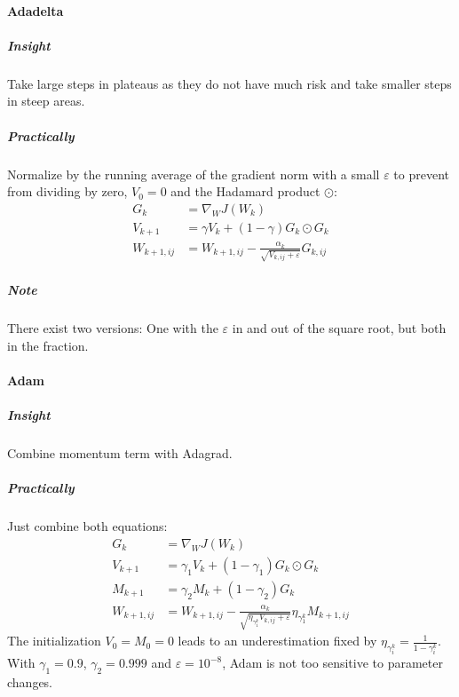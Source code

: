 			\paragraph{Adadelta}
				\subparagraph{Insight}
					Take large steps in plateaus as they do not have much risk and take smaller steps in steep areas.

				\subparagraph{Practically}
					Normalize by the running average of the gradient norm with a small \(\varepsilon\) to prevent from dividing by zero, \( V_0 = 0 \) and the Hadamard product \( \odot \):
					\begin{align}
						G_k           & = \nabla_W J(W_k)                                                           \\
						V_{k + 1}     & = \gamma V_k + (1 - \gamma) G_k \odot G_k                                   \\
						W_{k + 1, ij} & = W_{k + 1, ij} - \frac{\alpha_k}{\sqrt{V_{k, ij} + \varepsilon}} G_{k, ij}
					\end{align}

				\subparagraph{Note}
					There exist two versions: One with the \(\varepsilon\) in and out of the square root, but both in the fraction.

			\paragraph{Adam}
				\subparagraph{Insight}
					Combine momentum term with Adagrad.

				\subparagraph{Practically}
					Just combine both equations:
					\begin{align}
						G_k           & = \nabla_W J(W_k)                                                                                                   \\
						V_{k + 1}     & = \gamma_1 V_k + (1 - \gamma_1) G_k \odot G_k                                                                       \\
						M_{k + 1}     & = \gamma_2 M_k + (1 - \gamma_2) G_k                                                                                 \\
						W_{k + 1, ij} & = W_{k + 1, ij} - \frac{\alpha_k}{\sqrt{\eta_{\gamma_1^k} V_{k, ij} + \varepsilon}} \eta_{\gamma_1^k} M_{k + 1, ij}
					\end{align}
					The initialization \( V_0 = M_0 = 0 \) leads to an underestimation fixed by \( \eta_{\gamma_i^k} = \frac{1}{1 - \gamma_i^k} \). With \( \gamma_1 = 0.9 \), \( \gamma_2 = 0.999 \) and \( \varepsilon = 10^{-8} \), Adam is not too sensitive to parameter changes.

